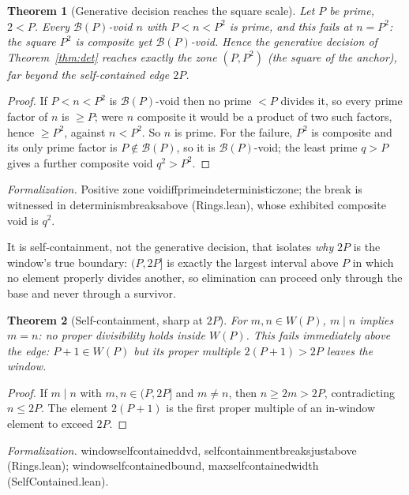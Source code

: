 \documentclass[11pt,a4paper]{amsart}
\theoremstyle{plain}
\newtheorem{theorem}{Theorem}[section]
\theoremstyle{definition}
\theoremstyle{plain}
\theoremstyle{remark}
\newcommand{\lean}[1]{\begingroup\upshape\ttfamily\def\_{\textunderscore\allowbreak}#1\endgroup}
\newcommand{\Formal}[1]{\par\smallskip\noindent\begingroup\raggedright\emph{Formalization.} #1\par\endgroup\smallskip}
\begin{document}
\begin{theorem}[Generative decision reaches the square scale]\label{thm:break}
Let $P$ be prime, $2<P$. Every $\mathcal{B}(P)$-void $n$ with $P<n<P^2$ is prime, and this
fails at $n=P^2$: the square $P^2$ is composite yet $\mathcal{B}(P)$-void. Hence the generative
decision of Theorem~\ref{thm:det} reaches exactly the zone $(P,P^2)$ (the square of the
anchor), far beyond the self-contained edge $2P$.
\end{theorem}

\begin{proof}
If $P<n<P^2$ is $\mathcal{B}(P)$-void then no prime $<P$ divides it, so every prime factor of
$n$ is $\ge P$; were $n$ composite it would be a product of two such factors, hence $\ge P^2$,
against $n<P^2$. So $n$ is prime. For the failure, $P^2$ is composite and its only prime factor
is $P\notin\mathcal{B}(P)$, so it is $\mathcal{B}(P)$-void; the least prime $q>P$ gives a
further composite void $q^2>P^2$.
\end{proof}

\Formal{Positive zone \lean{void\_iff\_prime\_in\_deterministic\_zone}; the break is witnessed
in \lean{determinism\_breaks\_above} (\lean{Rings.lean}), whose exhibited composite void is
$q^2$.}

It is self-containment, not the generative decision, that isolates \emph{why} $2P$ is the
window's true boundary: $(P,2P]$ is exactly the largest interval above $P$ in which no element
properly divides another, so elimination can proceed only through the base and never through a
survivor.

\begin{theorem}[Self-containment, sharp at $2P$]\label{thm:self}
For $m,n\in W(P)$, $m\mid n$ implies $m=n$: no proper divisibility holds inside $W(P)$.
This fails immediately above the edge: $P+1\in W(P)$ but its proper multiple
$2(P+1)>2P$ leaves the window.
\end{theorem}

\begin{proof}
If $m\mid n$ with $m,n\in(P,2P]$ and $m\ne n$, then $n\ge 2m>2P$, contradicting $n\le 2P$.
The element $2(P+1)$ is the first proper multiple of an in-window element to exceed $2P$.
\end{proof}

\Formal{\lean{window\_self\_contained\_dvd}, \lean{self\_containment\_breaks\_just\_above}
(\lean{Rings.lean}); \lean{window\_self\_contained\_bound},
\lean{max\_self\_contained\_width} (\lean{SelfContained.lean}).}
\end{document}
